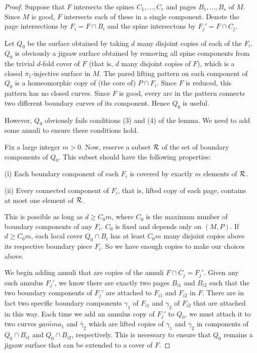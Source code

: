 \begin{proof}

Suppose that $F$ intersects the spines $C_1,\dots,C_r$ and pages
$B_1,\dots,B_s$ of $M$.  Since $M$ is good, $F$ intersects each of these in
a single component.  Denote the page intersections by $F_i = F \cap B_i$ and
the spine intersectons by $F_j' = F \cap C_j$.

Let $Q_0$ be the surface obtained by taking $d$ many disjoint copies of each of
the $F_i$. $Q_0$ is obviously a jigsaw surface obtained by
removing all spine components from the trivial $d$-fold cover of $F$ (that is,
$d$ many disjoint copies of $F$), which is a closed $\pi_1$-injective surface
in $M$.  The pared lifting pattern on each component of $Q_0$ is a homeomorphic
copy of (the core of) $P \cap F_i$. Since $F$ is reduced, this pattern has no
closed curves.  Since $F$ is good, every arc in the pattern connects two
different boundary curves of its component. Hence $Q_0$ is useful.

However, $Q_0$ obviously fails conditions (3) and (4) of the lemma. We need to
add some annuli to ensure these conditions hold.

Fix a large integer $m>0$. Now, reserve a subset $\mathcal{R}$ of the set of boundary
components of $Q_0$.  This subset should have the following properties:

(i) Each boundary component of each $F_i$ is covered by exactly $m$ elements of
$\mathcal{R}$.

(ii) Every connected component of $F_i$, that is, lifted copy of each page,
contains at most one element of $\mathcal{R}$.

This is possible as long as $d \geq C_0m$, where $C_0$ is the maximum number of
boundary components of any $F_i$. $C_0$ is fixed and depends only on $(M,P)$.
If $d\geq C_0m$,  each local cover $Q_0 \cap B_i$ has at least $C_0m$ many
disjoint copies above its respective boundary piece $F_i$.  So we have enough
copies to make our choices above.

We begin adding annuli that are copies of the annuli $F \cap C_j = F_j'$. Given
any such annulus $F_j'$, we know there are exactly two pages $B_{i1}$ and
$B_{i2}$ such that the two boundary components of $F_j'$ are attached to
$F_{i1}$ and $F_{i2}$ in $F$.  There are in fact two specific boundary
components $\gamma_1$ of $F_{i1}$ and $\gamma_2$ of $F_{i2}$ that are attached
in this way.  Each time we add an annulus copy of $F_j'$ to $Q_0$, we must
attach it to two curves $\widetilde{gamma_1}$ and $\widetilde{\gamma_2}$ which
are lifted copies of $\gamma_1$ and $\gamma_2$ in components of $Q_0 \cap
B_{i1}$ and $Q_0 \cap B_{i2}$, respectively.  This is necessary to ensure that
$Q_0$ remains a jigsaw surface that can be extended to a cover of
$F$.


\end{proof}
